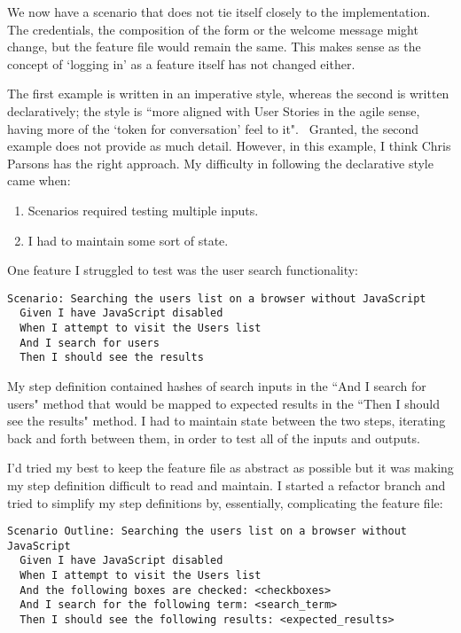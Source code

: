 We now have a scenario that does not tie itself closely to the implementation. The credentials, the composition of the form or the welcome message might change, but the feature file would remain the same. This makes sense as the concept of `logging in' as a feature itself has not changed either. 

The first example is written in an imperative style, whereas the second is written declaratively; the style is ``more aligned with User Stories in the agile sense, having more of the `token for conversation' feel to it".~\cite{appendix:cucumber:imperative} Granted, the second example does not provide as much detail. However, in this example, I think Chris Parsons has the right approach.
My difficulty in following the declarative style came when:

\begin{enumerate}
\item Scenarios required testing multiple inputs.
\item I had to maintain some sort of state.
\end{enumerate}

One feature I struggled to test was the user search functionality:

\begin{lstlisting}
Scenario: Searching the users list on a browser without JavaScript
  Given I have JavaScript disabled
  When I attempt to visit the Users list
  And I search for users
  Then I should see the results
 \end{lstlisting}

My step definition contained hashes of search inputs in the ``And I search for users" method that would be mapped to expected results in the ``Then I should see the results" method. I had to maintain state between the two steps, iterating back and forth between them, in order to test all of the inputs and outputs.

I'd tried my best to keep the feature file as abstract as possible but it was making my step definition difficult to read and maintain. I started a refactor branch and tried to simplify my step definitions by, essentially, complicating the feature file:

\begin{lstlisting}
Scenario Outline: Searching the users list on a browser without JavaScript
  Given I have JavaScript disabled
  When I attempt to visit the Users list
  And the following boxes are checked: <checkboxes>
  And I search for the following term: <search_term>
  Then I should see the following results: <expected_results>
\end{lstlisting}

